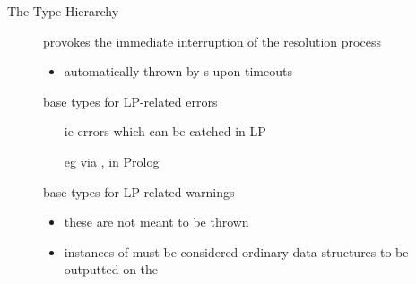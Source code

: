 \documentclass[handout]{beamer}
\begin{document}
\begin{frame}[allowframebreaks]{The  Type Hierarchy}
\begin{description}
        \item[] provokes the immediate interruption of the resolution process
        \begin{itemize}\small
            \item automatically thrown by s upon \alert{timeouts}
        \end{itemize}

        \framebreak

        \item[] base types for LP-related errors
        \begin{itemize}\small
            \item[ie] errors which can be catched in LP
            \item[eg] via , in Prolog
        \end{itemize}

        \item[] base types for LP-related warnings
        \begin{itemize}\small
            \item these are not meant to be thrown
            \item instances of  must be considered ordinary data structures to be outputted on the  
        \end{itemize}
    \end{description}
\end{frame}
\end{document}

